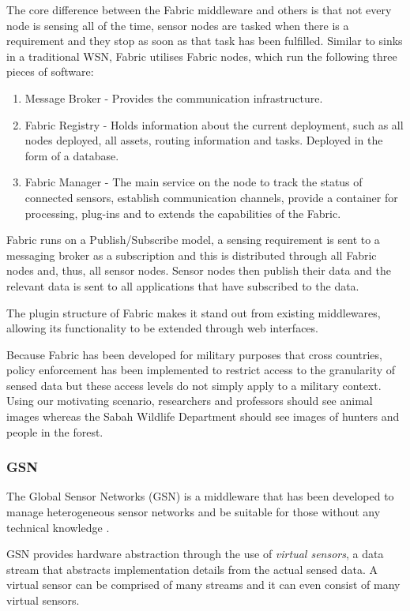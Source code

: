 The core difference between the Fabric middleware and others is that not every node is sensing all of the time, sensor nodes are tasked when there is a requirement and they stop as soon as that task has been fulfilled. Similar to sinks in a traditional WSN, Fabric utilises Fabric nodes, which run the following three pieces of software:
\begin{enumerate}
	\item Message Broker - Provides the communication infrastructure.
	\item Fabric Registry - Holds information about the current deployment, such as all nodes deployed, all assets, routing information and tasks. Deployed in the form of a database.
	\item Fabric Manager - The main service on the node to track the status of connected sensors, establish communication channels, provide a container for processing, plug-ins and to extends the capabilities of the Fabric.
\end{enumerate}

Fabric runs on a Publish/Subscribe model, a sensing requirement is sent to a messaging broker as a subscription and this is distributed through all Fabric nodes and, thus, all sensor nodes. Sensor nodes then publish their data and the relevant data is sent to all applications that have subscribed to the data. 

The plugin structure of Fabric makes it stand out from existing middlewares, allowing its functionality to be extended through web interfaces.

Because Fabric has been developed for military purposes that cross countries, policy enforcement has been implemented to restrict access to the granularity of sensed data but these access levels do not simply apply to a military context. Using our motivating scenario, researchers and professors should see animal images whereas the Sabah Wildlife Department should see images of hunters and people in the forest.

	\subsubsection{GSN}\label{sec:GSN}
		The Global Sensor Networks (GSN) is a middleware that has been developed to manage heterogeneous sensor networks and be suitable for those without any technical knowledge \cite{F2006}.

GSN provides hardware abstraction through the use of  \textit{virtual sensors}, a data stream that abstracts implementation details from the actual sensed data. A virtual sensor can be comprised of many streams and it can even consist of many virtual sensors. 

